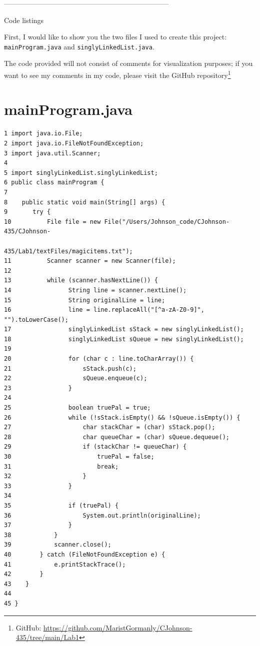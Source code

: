 \documentclass[a4paper,12pt]{article}
\begin{document}
\begin{center}
    -----------------------------------------------------------------------
\end{center}

\begin{center}
\begin{large}
    Code listings
\end{large}
\end{center}


First, I would like to show you the two files I used to create this project: \verb|mainProgram.java| and \verb|singlyLinkedList.java|. 

\begin{footnotesize}
The code provided will not consist of comments for visualization purposes; if you want to see my comments in my code, please visit the GitHub repository\footnote{GitHub: \url{https://github.com/MaristGormanly/CJohnson-435/tree/main/Lab1}} 
\end{footnotesize}

\section{mainProgram.java}
\begin{verbatim}
1 import java.io.File;
2 import java.io.FileNotFoundException;
3 import java.util.Scanner;
4 
5 import singlyLinkedList.singlyLinkedList;
6 public class mainProgram {
7 
8    public static void main(String[] args) {
9       try {
10          File file = new File("/Users/Johnson_code/CJohnson-435/CJohnson- 
                                    435/Lab1/textFiles/magicitems.txt");
11          Scanner scanner = new Scanner(file);
12            
13          while (scanner.hasNextLine()) {
14                String line = scanner.nextLine();
15                String originalLine = line;  
16                line = line.replaceAll("[^a-zA-Z0-9]", "").toLowerCase();
17                singlyLinkedList sStack = new singlyLinkedList();
18                singlyLinkedList sQueue = new singlyLinkedList();
19            
20                for (char c : line.toCharArray()) {
21                    sStack.push(c);
22                    sQueue.enqueue(c);
23                }
24            
25                boolean truePal = true;
26                while (!sStack.isEmpty() && !sQueue.isEmpty()) {
27                    char stackChar = (char) sStack.pop();  
28                    char queueChar = (char) sQueue.dequeue();
29                    if (stackChar != queueChar) {
30                        truePal = false;
31                        break;
32                    }
33                }
34            
35                if (truePal) {
36                    System.out.println(originalLine);  
37                }
38            }
39            scanner.close(); 
40        } catch (FileNotFoundException e) { 
41            e.printStackTrace();
42        }
43    }
44    
45 }   
\end{verbatim}
\end{document}
